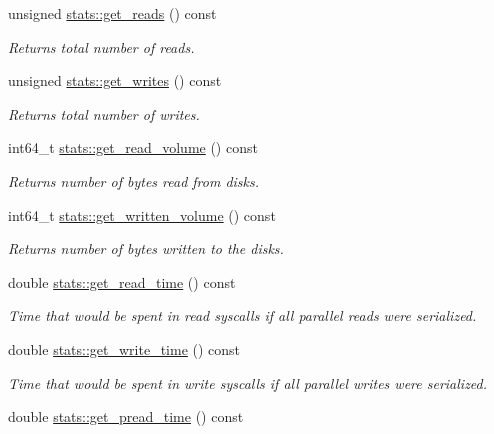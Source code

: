 \begin{CompactItemize}
\item 
unsigned \hyperlink{group__iolayer_g6263716c232b9ebe0936f34fd25dd8d4}{stats::get\_\-reads} () const 
\begin{CompactList}\small\item\em Returns total number of reads. \item\end{CompactList}\item 
unsigned \hyperlink{group__iolayer_gf75ae32372c803dcf31e58b0a5e312e2}{stats::get\_\-writes} () const 
\begin{CompactList}\small\item\em Returns total number of writes. \item\end{CompactList}\item 
int64\_\-t \hyperlink{group__iolayer_g32d9c7436d0728f59ce53c269484ced3}{stats::get\_\-read\_\-volume} () const 
\begin{CompactList}\small\item\em Returns number of bytes read from disks. \item\end{CompactList}\item 
int64\_\-t \hyperlink{group__iolayer_g29a2dd5f32d956bae0b02503ac7d0876}{stats::get\_\-written\_\-volume} () const 
\begin{CompactList}\small\item\em Returns number of bytes written to the disks. \item\end{CompactList}\item 
double \hyperlink{group__iolayer_g5425890c2062eb9bed6a73343b8ffb25}{stats::get\_\-read\_\-time} () const 
\begin{CompactList}\small\item\em Time that would be spent in read syscalls if all parallel reads were serialized. \item\end{CompactList}\item 
double \hyperlink{group__iolayer_g38c56edfce29a67fc2312dd2d012caaa}{stats::get\_\-write\_\-time} () const 
\begin{CompactList}\small\item\em Time that would be spent in write syscalls if all parallel writes were serialized. \item\end{CompactList}\item 
double \hyperlink{group__iolayer_g8dce58f17e3ef7d8465b097a72f0a781}{stats::get\_\-pread\_\-time} () const 

\end{CompactItemize}
